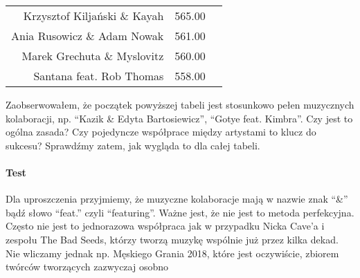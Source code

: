 \documentclass[11pt]{article}
\begin{document}
\begin{tabular}{r|ll}
	 Krzysztof Kiljański \& Kayah                               & 565.00                                                     \\
	 Ania Rusowicz \& Adam Nowak                                & 561.00                                                     \\
	 Marek Grechuta \& Myslovitz                                & 560.00                                                     \\
	 Santana feat. Rob Thomas                                  & 558.00                                                   \\
\end{tabular}


    
    Zaobserwowałem, że początek powyższej tabeli jest stosunkowo pełen
muzycznych kolaboracji, np. ``Kazik \& Edyta Bartosiewicz'', ``Gotye
feat. Kimbra''. Czy jest to ogólna zasada? Czy pojedyncze współprace
między artystami to klucz do sukcesu? Sprawdźmy zatem, jak wygląda to
dla całej tabeli.

\hypertarget{test}{%
\paragraph{Test}\label{test}}

Dla uproszczenia przyjmiemy, że muzyczne kolaboracje mają w nazwie znak
``\&'' bądź słowo ``feat.'' czyli ``featuring''. Ważne jest, że nie jest
to metoda perfekcyjna. Często nie jest to jednorazowa współpraca jak w
przypadku Nicka Cave'a i zespołu The Bad Seeds, którzy tworzą muzykę
wspólnie już przez kilka dekad. Nie wliczamy jednak np. Męskiego Grania
2018, które jest oczywiście, zbiorem twórców tworzących zazwyczaj osobno
\end{document}

